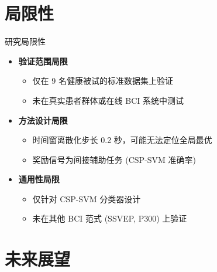\section{局限性}

\begin{frame}{研究局限性}
    \begin{itemize}
        \item \textbf{验证范围局限}
        \begin{itemize}
            \item 仅在 9 名健康被试的标准数据集上验证
            \item 未在真实患者群体或在线 BCI 系统中测试
        \end{itemize}
        
        \item \textbf{方法设计局限}
        \begin{itemize}
            \item 时间窗离散化步长 0.2 秒，可能无法定位全局最优
            \item 奖励信号为间接辅助任务 (CSP-SVM 准确率)
        \end{itemize}
        
        \item \textbf{通用性局限}
        \begin{itemize}
            \item 仅针对 CSP-SVM 分类器设计
            \item 未在其他 BCI 范式 (SSVEP, P300) 上验证
        \end{itemize}
    \end{itemize}
\end{frame}

\section{未来展望}

